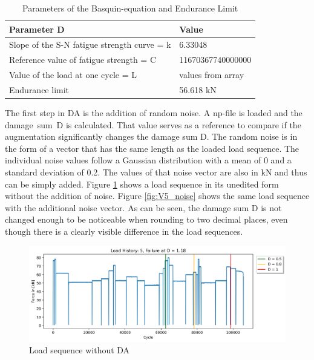 \begin{table}
	\begin{center}
		\begin{tabular}{|| l | l ||}
			\hline
			\rule{0pt}{2ex}Parameter D & Value\\
			\hline
			\hline
			\rule{0pt}{2ex}Slope of the S-N fatigue strength curve = k & 6.33048\\ \hline
			Reference value of fatigue strength = C & 11670367740000000\\	\hline
			Value of the load at one cycle = L & values from array \\ \hline
			Endurance limit & 56.618 kN \\ \hline
		\end{tabular}
		\caption{Parameters of the Basquin-equation and Endurance Limit}
		\label{paramBQ}
	\end{center}
	\vspace{-4mm}
\end{table}

The first step in DA is the addition of random noise. A np-file is loaded and the damage~sum~D is calculated. That value serves as a reference to compare if the augmentation significantly changes the damage sum D.
The random noise is in the form of a vector that has the same length as the loaded load sequence.
The individual noise values follow a Gaussian distribution with a mean of 0 and a standard deviation of 0.2. 
The values of that noise vector are also in kN and thus can be simply added.
Figure \ref{fig:V5} shows a load sequence in its unedited form without the addition of noise. Figure \ref{fig:V5_noise} shows the same load sequence with the additional noise vector. As can be seen, the damage sum D is not changed enough to be noticeable when rounding to two decimal places, even though there is a clearly visible difference in the load sequences.

\begin{figure}[H]
	\centering
	\includegraphics[width=1\linewidth]{IMGs/Verlauf_5.jpg}
	\caption{Load sequence without DA}
	\label{fig:V5}
\end{figure}

